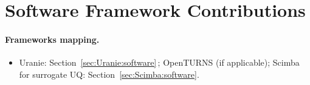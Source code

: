 \section{Software Framework Contributions}

\paragraph{Frameworks mapping.}
\begin{itemize}
	\item Uranie: Section~\ref{sec:Uranie:software}\,; OpenTURNS (if applicable); Scimba for surrogate UQ: Section~\ref{sec:Scimba:software}.
\end{itemize}


